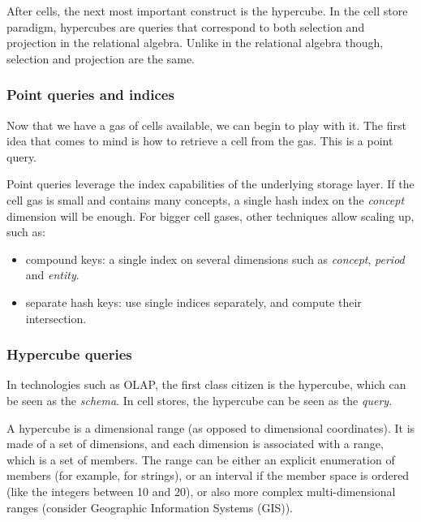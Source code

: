 \documentclass{acm_proc_article-sp}
\begin{document}
After cells, the next most important construct is the hypercube. In the cell store paradigm, hypercubes are queries that correspond to both selection and projection in the relational algebra. Unlike in the relational algebra though, selection and projection are the same.

\subsubsection{Point queries and indices}

Now that we have a gas of cells available, we can begin to play with it. The first idea that comes to mind is how to retrieve a cell from the gas. This is a point query.

Point queries leverage the index capabilities of the underlying storage layer. If the cell gas is small and contains many concepts, a single hash index on the \emph{concept} dimension will be enough. For bigger cell gases, other techniques allow scaling up, such as:
\begin{itemize}
\item compound keys: a single index on several dimensions such as \emph{concept}, \emph{period} and \emph{entity}.
\item separate hash keys: use single indices separately, and compute their intersection.
\end{itemize}

\subsubsection{Hypercube queries}
In technologies such as OLAP, the first class citizen is the hypercube, which can be seen as the \emph{schema}. In cell stores, the hypercube can be seen as the \emph{query}.

A hypercube is a dimensional range (as opposed to dimensional coordinates). It is made of a set of dimensions, and each dimension is associated with a range, which is a set of members. The range can be either an explicit enumeration of members (for example, for strings), or an interval if the member space is ordered (like the integers between 10 and 20), or also more complex multi-dimensional ranges (consider Geographic Information Systems (GIS)).
\end{document}
